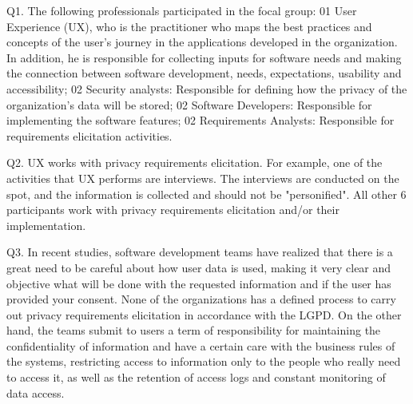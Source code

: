 \documentclass[conference]{IEEEtran}
\begin{document}
Q1. The following professionals participated in the focal group: 01 User Experience (UX), who is the practitioner who maps the best practices and concepts of the user's journey in the applications developed in the organization. In addition, he is responsible for collecting inputs for software needs and making the connection between software development, needs, expectations, usability and accessibility; 02 Security analysts: Responsible for defining how the privacy of the organization's data will be stored; 02 Software Developers: Responsible for implementing the software features; 02 Requirements Analysts: Responsible for requirements elicitation activities.


Q2. UX works with privacy requirements elicitation. For example, one of the activities that UX performs are interviews. The interviews are conducted on the spot, and the information is collected and should not be "personified". All other 6 participants work with privacy requirements elicitation and/or their implementation.


Q3. In recent studies, software development teams have realized that there is a great need to be careful about how user data is used, making it very clear and objective what will be done with the requested information and if the user has provided your consent. None of the organizations has a defined process to carry out privacy requirements elicitation in accordance with the LGPD. On the other hand, the teams submit to users a term of responsibility for maintaining the confidentiality of information and have a certain care with the business rules of the systems, restricting access to information only to the people who really need to access it, as well as the retention of access logs and constant monitoring of data access.
\end{document}
